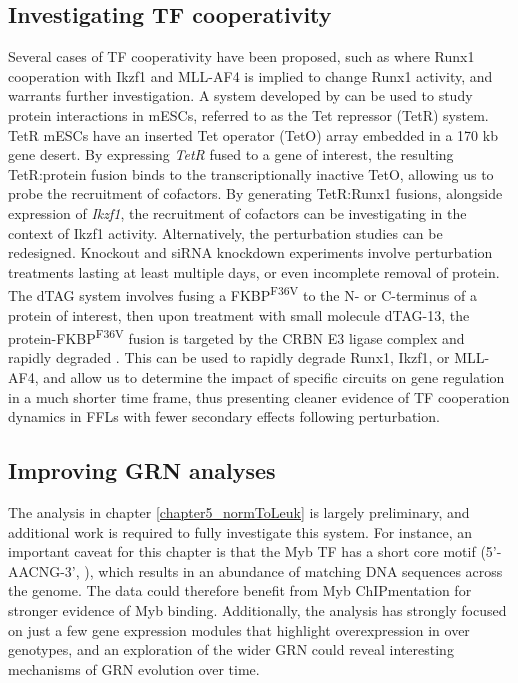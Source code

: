 \subsection{Investigating TF cooperativity}

Several cases of TF cooperativity have been proposed, such as where Runx1 cooperation with Ikzf1 and MLL-AF4 is implied to change Runx1 activity, and warrants further investigation. A system developed by \cite{blackledge_variant_2014} can be used to study protein interactions in mESCs, referred to as the Tet repressor (TetR) system. TetR mESCs have an inserted Tet operator (TetO) array embedded in a 170 kb gene desert. By expressing \textit{TetR} fused to a gene of interest, the resulting TetR:protein fusion binds to the transcriptionally inactive TetO, allowing us to probe the recruitment of cofactors. By generating TetR:Runx1 fusions, alongside expression of \textit{Ikzf1}, the recruitment of cofactors can be investigating in the context of Ikzf1 activity. Alternatively, the perturbation studies can be redesigned. Knockout and siRNA knockdown experiments involve perturbation treatments lasting at least multiple days, or even incomplete removal of protein. The dTAG system involves fusing a FKBP\textsuperscript{F36V} to the N- or C-terminus of a protein of interest, then upon treatment with small molecule dTAG-13, the protein-FKBP\textsuperscript{F36V} fusion is targeted by the CRBN E3 ligase complex and rapidly degraded \citep{nabet_dtag_2018}. This can be used to rapidly degrade Runx1, Ikzf1, or MLL-AF4, and allow us to determine the impact of specific circuits on gene regulation in a much shorter time frame, thus presenting cleaner evidence of TF cooperation dynamics in FFLs with fewer secondary effects following perturbation.

\subsection{Improving GRN analyses}

The analysis in chapter \ref{chapter5_normToLeuk} is largely preliminary, and additional work is required to fully investigate this system. For instance, an important caveat for this chapter is that the Myb TF has a short core motif (5'-AACNG-3', \cite{ogata_solution_1994}), which results in an abundance of matching DNA sequences across the genome. The data could therefore benefit from Myb ChIPmentation for stronger evidence of Myb binding. Additionally, the analysis has strongly focused on just a few gene expression modules that highlight overexpression in \mybwt{} over \mybmre{} genotypes, and an exploration of the wider GRN could reveal interesting mechanisms of GRN evolution over time.

